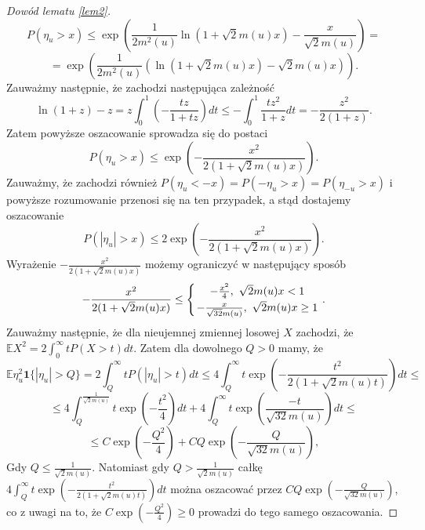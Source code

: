 \documentclass{mwart}
\begin{document}
\begin{proof}[Dowód lematu \ref{lem2}]
\begin{displaymath}
P(\eta_u>x)\leq \exp\left(\frac{1}{2m^2(u)}\ln \left(1+\sqrt{2}m(u)x\right)-\frac{x}{\sqrt{2}m(u)}\right)=
\end{displaymath}
\begin{displaymath}
=\exp\left(\frac{1}{2m^2(u)}\left(\ln \left(1+\sqrt{2}m(u)x\right)-\sqrt{2}m(u)x\right)\right).
\end{displaymath}
Zauważmy następnie, że zachodzi następująca zależność
\begin{displaymath}
\ln(1+z)-z=z\int_0^1\left(-\frac{tz}{1+tz}\right)dt\leq -\int_0^1\frac{tz^2}{1+z}dt=-\frac{z^2}{2(1+z)}.
\end{displaymath}Zatem powyższe oszacowanie sprowadza się do postaci 
\begin{displaymath}
P(\eta_u>x)\leq \exp\left(-\frac{x^2}{2(1+\sqrt{2}m(u)x)}\right).
\end{displaymath}
Zauważmy, że zachodzi również $P(\eta_u <-x)=P(-\eta_u>x)=P(\eta_{-u}>x)$ i powyższe rozumowanie przenosi się na ten przypadek, a stąd dostajemy oszacowanie 
\begin{displaymath}
P(|\eta_u|>x)\leq 2\exp\left(-\frac{x^2}{2(1+\sqrt{2}m(u)x)}\right).
\end{displaymath}
Wyrażenie $-\frac{x^2}{2(1+\sqrt{2}m(u)x)}$ możemy ograniczyć w następujący sposób
\begin{displaymath}
-\frac{x^2}{2(1+\sqrt{2}m(u)x)}\leq \left\{{-\frac{x^2}{4},\ \sqrt{2}m(u)x<1}\atop{-\frac{x}{\sqrt{32}m(u)},\ \sqrt{2}m(u)x\geq  1}\right. .
\end{displaymath}
Zauważmy następnie, że dla nieujemnej zmiennej losowej $X$ zachodzi, że $\mathbb{E}X^2=2\int_0^{\infty}tP(X>t)dt$. Zatem dla dowolnego $ Q>0$ mamy, że
\begin{displaymath}
\mathbb{E}\eta_u^2\pmb{1}\{|\eta_u|>Q\}=2\int_Q^{\infty}tP(|\eta_u|>t)dt\leq 4\int_Q^{\infty}t\exp\left(-\frac{t^2}{2(1+\sqrt{2}m(u)t)}\right)dt\leq
\end{displaymath}
\begin{displaymath}
\leq 4\int_Q^{\frac{1}{\sqrt{2}m(u)}}t\exp\left(-\frac{t^2}{4}\right)dt+4\int_Q^{\infty}t\exp \left(\frac{-t}{\sqrt{32}m(u)}\right)dt\leq
\end{displaymath}
\begin{displaymath}
\leq C\exp\left(-\frac{Q^2}{4}\right)+CQ\exp\left(-\frac{Q}{\sqrt{32}m(u)}\right),
\end{displaymath}
Gdy $Q\leq \frac{1}{\sqrt{2}m(u)}$. Natomiast gdy $Q>\frac{1}{\sqrt{2}m(u)}$ całkę $4\int_Q^{\infty}t\exp\left(-\frac{t^2}{2(1+\sqrt{2}m(u)t)}\right)dt$ można oszacować przez $CQ\exp\left(-\frac{Q}{\sqrt{32}m(u)}\right)$, co z uwagi na to, że $C\exp\left(-\frac{Q^2}{4}\right)\geq 0$ prowadzi do tego samego oszacowania.

\end{proof}
\end{document}
